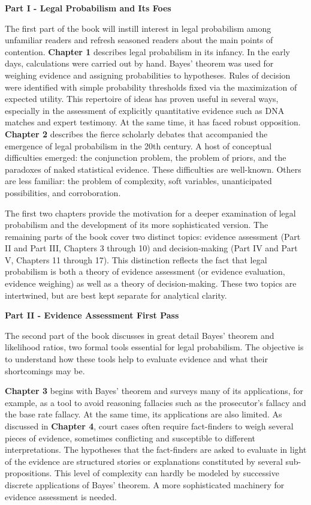 \documentclass[
  10pt,
  dvipsnames,enabledeprecatedfontcommands]{scrartcl}
\begin{document}
\vspace{2mm}

\noindent \textbf{Part I - Legal Probabilism and Its Foes}

\noindent The first part of the book will instill interest in legal
probabilism among unfamiliar readers and refresh seasoned readers about
the main points of contention. \textbf{Chapter 1} describes legal
probabilism in its infancy. In the early days, calculations were carried
out by hand. Bayes' theorem was used for weighing evidence and assigning
probabilities to hypotheses. Rules of decision were identified with
simple probability thresholds fixed via the maximization of expected
utility. This repertoire of ideas has proven useful in several ways,
especially in the assessment of explicitly quantitative evidence such as
DNA matches and expert testimony. At the same time, it has faced robust
opposition. \textbf{Chapter 2} describes the fierce scholarly debates
that accompanied the emergence of legal probabilism in the 20th century.
A host of conceptual difficulties emerged: the conjunction problem, the
problem of priors, and the paradoxes of naked statistical evidence.
These difficulties are well-known. Others are less familiar: the problem
of complexity, soft variables, unanticipated possibilities, and
corroboration.

The first two chapters provide the motivation for a deeper examination
of legal probabilism and the development of its more sophisticated
version. The remaining parts of the book cover two distinct topics:
evidence assessment (Part II and Part III, Chapters 3 through 10) and
decision-making (Part IV and Part V, Chapters 11 through 17). This
distinction reflects the fact that legal probabilism is both a theory of
evidence assessment (or evidence evaluation, evidence weighing) as well
as a theory of decision-making. These two topics are intertwined, but
are best kept separate for analytical clarity.

\vspace{3mm}

\noindent \textbf{Part II - Evidence Assessment First Pass}

\noindent The second part of the book discusses in great detail Bayes'
theorem and likelihood ratios, two formal tools essential for legal
probabilism. The objective is to understand how these tools help to
evaluate evidence and what their shortcomings may be.

\textbf{Chapter 3} begins with Bayes' theorem and surveys many of its
applications, for example, as a tool to avoid reasoning fallacies such
as the prosecutor's fallacy and the base rate fallacy. At the same time,
its applications are also limited. As discussed in \textbf{Chapter 4},
court cases often require fact-finders to weigh several pieces of
evidence, sometimes conflicting and susceptible to different
interpretations. The hypotheses that the fact-finders are asked to
evaluate in light of the evidence are structured stories or explanations
constituted by several sub-propositions. This level of complexity can
hardly be modeled by successive discrete applications of Bayes' theorem.
A more sophisticated machinery for evidence assessment is needed.
\end{document}
